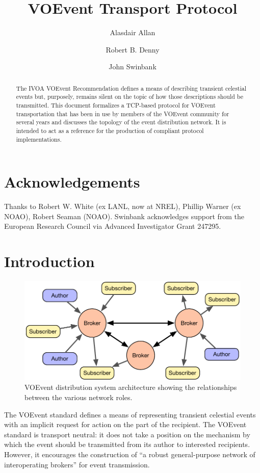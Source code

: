 \documentclass[a4paper,11pt]{ivoa}
\title{VOEvent Transport Protocol}
\author{Alasdair Allan}
\author{Robert B. Denny}
\author{John Swinbank}
\begin{document}
\begin{abstract}

The IVOA VOEvent Recommendation \citep{Seaman:2011} defines a means of
describing transient celestial events but, purposely, remains silent on the
topic of how those descriptions should be transmitted. This document
formalizes a TCP-based protocol for VOEvent transportation that has been in
use by members of the VOEvent community for several years and discusses the
topology of the event distribution network. It is intended to act as a
reference for the production of compliant protocol implementations.

\end{abstract}

\section*{Acknowledgements}

Thanks to Robert W. White (ex LANL, now at NREL), Phillip Warner (ex NOAO),
Robert Seaman (NOAO). Swinbank acknowledges support from the European
Research Council via Advanced Investigator Grant 247295.

\section{Introduction}
\label{sec:intro}

\begin{figure}
  \begin{center}
  \includegraphics{figures/network.pdf}
  \end{center}

  \caption{VOEvent distribution system architecture showing the relationships
  between the various network roles.}

  \label{fig:network}
\end{figure}

The VOEvent standard \citep{Seaman:2011} defines a means of representing
transient celestial events with an implicit request for action on the part of
the recipient. The VOEvent standard is transport neutral: it does not take a
position on the mechanism by which the event should be transmitted from its
author to interested recipients. However, it encourages the construction of
``a robust general-purpose network of interoperating brokers'' for event
transmission.
\end{document}
